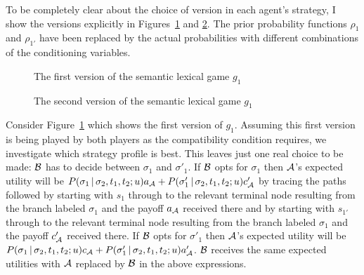 To be completely clear about the choice of version in each agent's strategy, I show the versions explicitly in Figures~\ref{fig:semantic lexical game g1 version1} and \ref{fig:semantic lexical game g1 version2}. The prior probability functions $\rho_1$ and $\rho_{1'}$ have been replaced by the actual probabilities with different combinations of the conditioning variables.

\begin{figure}[h] 

\caption{The first version of the semantic lexical game $g_1$}
\label{fig:semantic lexical game g1 version1}
\end{figure}

\begin{figure}[h] 

\caption{The second version of the semantic lexical game $g_1$}
\label{fig:semantic lexical game g1 version2}
\end{figure}


Consider Figure~\ref{fig:semantic lexical game g1 version1} which shows the first version of $g_1$. Assuming this first version is being played by both players as the compatibility condition requires, we investigate which strategy profile is best. This leaves just one real choice to be made: $\cal B$ has to decide between $\sigma_1$ and $\sigma'_1$. If $\cal B$ opts for $\sigma_1$ then $\cal A$'s expected utility will be $P(\sigma_1 \,|\, \sigma_2, t_1, t_2; u)a_{\cal A} + P(\sigma'_1 \,|\, \sigma_2, t_1, t_2; u)c'_{\cal A}$ by tracing the paths followed by starting with $s_1$ through to the relevant terminal node resulting from the branch labeled $\sigma_1$ and the payoff $a_{\cal A}$ received there and by starting with $s_{1'}$ through to the relevant terminal node resulting from the branch labeled $\sigma_1$ and the payoff $c'_{\cal A}$ received there. If $\cal B$ opts for $\sigma'_1$ then $\cal A$'s expected utility will be $P(\sigma_1 \,|\, \sigma_2, t_1, t_2; u)c_{\cal A} + P(\sigma'_1 \,|\, \sigma_2, t_1, t_2; u)a'_{\cal A}$. $\cal B$ receives the same expected utilities with $\cal A$ replaced by $\cal B$ in the above expressions.

